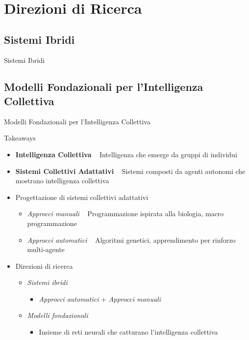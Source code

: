 \documentclass[presentation, 10pt,aspectratio=169]{beamer}\mode<presentation>{\usetheme{AMSBolognaFC}}
\begin{document}
\section{Direzioni di Ricerca}
	\subsection{Sistemi Ibridi}
\begin{frame}{Sistemi Ibridi}

\end{frame}

\subsection{Modelli Fondazionali per l'Intelligenza Collettiva}
\begin{frame}{Modelli Fondazionali per l'Intelligenza Collettiva}

\end{frame}
\begin{frame}{Takeaways}
	\begin{itemize}
		\item \textbf{Intelligenza Collettiva} \faArrowRight ~ Intelligenza che emerge da gruppi di individui
		\item \textbf{Sistemi Collettivi Adattativi} \faArrowRight ~ Sistemi composti da agenti autonomi che mostrano intelligenza collettiva
		\item Progettazione di sistemi collettivi adattativi
		\begin{itemize}
			\item \emph{Approcci manuali} \faArrowRight ~ Programmazione ispirata alla biologia, macro programmazione
			\item \emph{Approcci automatici} \faArrowRight ~ Algoritmi genetici, apprendimento per rinforzo multi-agente
		\end{itemize}
		\item Direzioni di ricerca
		\begin{itemize}
			\item \emph{Sistemi ibridi}
			\begin{itemize}
				\item \emph{Approcci automatici} + \emph{Approcci manuali}
			\end{itemize}
			\item \emph{Modelli fondazionali}
			\begin{itemize}
				\item Insieme di reti neurali che catturano l'intelligenza collettiva
			\end{itemize}
		\end{itemize}
	\end{itemize}
\end{frame}


\section*{\refname}


\end{document}
